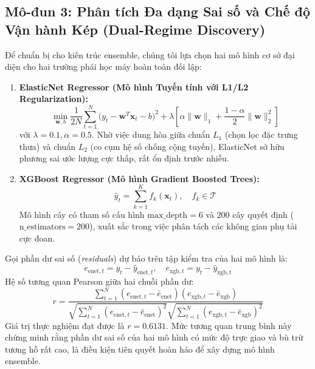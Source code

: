 \subsection{Mô-đun 3: Phân tích Đa dạng Sai số và Chế độ Vận hành Kép (Dual-Regime Discovery)}
Để chuẩn bị cho kiến trúc ensemble, chúng tôi lựa chọn hai mô hình cơ sở đại diện cho hai trường phái học máy hoàn toàn đối lập:
\begin{enumerate}
    \item \textbf{ElasticNet Regressor (Mô hình Tuyến tính với L1/L2 Regularization):}
    \begin{equation}
        \min_{\mathbf{w}, b} \frac{1}{2N} \sum_{t=1}^N \Big(y_t - \mathbf{w}^T \mathbf{x}_t - b\Big)^2 + \lambda \left[ \alpha \|\mathbf{w}\|_1 + \frac{1 - \alpha}{2} \|\mathbf{w}\|_2^2 \right]
    \end{equation}
    với $\lambda = 0.1, \alpha = 0.5$. Nhờ việc dung hòa giữa chuẩn $L_1$ (chọn lọc đặc trưng thưa) và chuẩn $L_2$ (co cụm hệ số chống cộng tuyến), ElasticNet sở hữu phương sai ước lượng cực thấp, rất ổn định trước nhiễu.
    \item \textbf{XGBoost Regressor (Mô hình Gradient Boosted Trees):}
    \begin{equation}
        \hat{y}_t = \sum_{k=1}^K f_k(\mathbf{x}_t), \quad f_k \in \mathcal{T}
    \end{equation}
    Mô hình cây có tham số cấu hình $\text{max\_depth} = 6$ và $200$ cây quyết định ($\text{n\_estimators} = 200$), xuất sắc trong việc phân tách các không gian phụ tải cực đoan.
\end{enumerate}

Gọi phần dư sai số (\textit{residuals}) dự báo trên tập kiểm tra của hai mô hình là:
\begin{equation}
    e_{\text{enet}, t} = y_t - \hat{y}_{\text{enet}, t}, \quad e_{\text{xgb}, t} = y_t - \hat{y}_{\text{xgb}, t}
\end{equation}
Hệ số tương quan Pearson giữa hai chuỗi phần dư:
\begin{equation}
    r = \frac{\sum_{t=1}^N (e_{\text{enet}, t} - \bar{e}_{\text{enet}})(e_{\text{xgb}, t} - \bar{e}_{\text{xgb}})}{\sqrt{\sum_{t=1}^N (e_{\text{enet}, t} - \bar{e}_{\text{enet}})^2} \sqrt{\sum_{t=1}^N (e_{\text{xgb}, t} - \bar{e}_{\text{xgb}})^2}}
\end{equation}
Giá trị thực nghiệm đạt được là \textbf{$r = 0.6131$}. Mức tương quan trung bình này chứng minh rằng phần dư sai số của hai mô hình có mức độ trực giao và bù trừ tương hỗ rất cao, là điều kiện tiên quyết hoàn hảo để xây dựng mô hình ensemble.

